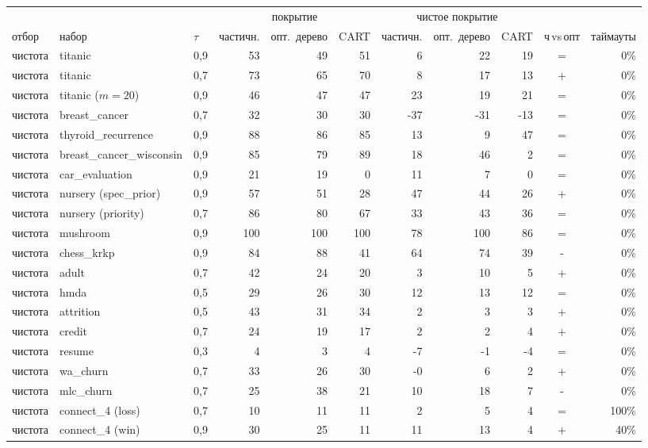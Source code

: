 \begin{tabular}{lllrrrrrrcr}
\toprule
& & & \multicolumn{3}{c}{покрытие} & \multicolumn{3}{c}{чистое покрытие} & &\\
отбор & набор & $\tau$ & частичн. & опт.\ дерево & CART & частичн. & опт.\ дерево & CART & ч$\,$vs$\,$опт & таймауты\\
\midrule
чистота & titanic & 0{,}9 & 53 & 49 & 51 & 6 & 22 & 19 & = & 0\%\\
чистота & titanic & 0{,}7 & 73 & 65 & 70 & 8 & 17 & 13 & + & 0\%\\
чистота & titanic ($m{=}20$) & 0{,}9 & 46 & 47 & 47 & 23 & 19 & 21 & = & 0\%\\
чистота & breast\_cancer & 0{,}7 & 32 & 30 & 30 & -37 & -31 & -13 & = & 0\%\\
чистота & thyroid\_recurrence & 0{,}9 & 88 & 86 & 85 & 13 & 9 & 47 & = & 0\%\\
чистота & breast\_cancer\_wisconsin & 0{,}9 & 85 & 79 & 89 & 18 & 46 & 2 & = & 0\%\\
чистота & car\_evaluation & 0{,}9 & 21 & 19 & 0 & 11 & 7 & 0 & = & 0\%\\
чистота & nursery (spec\_prior) & 0{,}9 & 57 & 51 & 28 & 47 & 44 & 26 & + & 0\%\\
чистота & nursery (priority) & 0{,}7 & 86 & 80 & 67 & 33 & 43 & 36 & = & 0\%\\
чистота & mushroom & 0{,}9 & 100 & 100 & 100 & 78 & 100 & 86 & = & 0\%\\
чистота & chess\_krkp & 0{,}9 & 84 & 88 & 41 & 64 & 74 & 39 & - & 0\%\\
чистота & adult & 0{,}7 & 42 & 24 & 20 & 3 & 10 & 5 & + & 0\%\\
чистота & hmda & 0{,}5 & 29 & 26 & 30 & 12 & 13 & 12 & = & 0\%\\
чистота & attrition & 0{,}5 & 43 & 31 & 34 & 2 & 3 & 3 & + & 0\%\\
чистота & credit & 0{,}7 & 24 & 19 & 17 & 2 & 2 & 4 & + & 0\%\\
чистота & resume & 0{,}3 & 4 & 3 & 4 & -7 & -1 & -4 & = & 0\%\\
чистота & wa\_churn & 0{,}7 & 33 & 26 & 30 & -0 & 6 & 2 & + & 0\%\\
чистота & mlc\_churn & 0{,}7 & 25 & 38 & 21 & 10 & 18 & 7 & - & 0\%\\
чистота & connect\_4 (loss) & 0{,}7 & 10 & 11 & 11 & 2 & 5 & 4 & = & 100\%\\
чистота & connect\_4 (win) & 0{,}9 & 30 & 25 & 11 & 11 & 13 & 4 & + & 40\%\\

\end{tabular}

